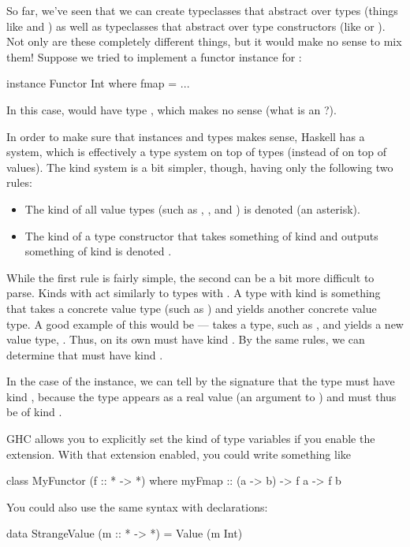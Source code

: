 So far, we've seen that we can create typeclasses that abstract over types (things like
 and ) as well as typeclasses that abstract over type constructors (like
 or ). Not only are these completely different things, but it would make
no sense to mix them! Suppose we tried to implement a functor instance for :
\begin{haskell}
instance Functor Int where
  fmap = ...
\end{haskell}
In this case,  would have type , which makes
no sense (what is an ?).

In order to make sure that instances and types makes sense, Haskell has a  system,
which is effectively a type system on top of types (instead of on top of values). The kind system is
a bit simpler, though, having only the following two rules:
\begin{itemize}
    \item The kind of all value types (such as , , and )
        is denoted \inline{*} (an asterisk).
    \item The kind of a type constructor that takes something of kind  and outputs
        something of kind  is denoted .
\end{itemize}

While the first rule is fairly simple, the second can be a bit more difficult to parse. Kinds with
\inline{->} act similarly to types with \inline{->}. A type with kind \inline{* -> *} is something
that takes a concrete value type (such as ) and yields another concrete value type. A
good example of this would be  ---  takes a type, such as ,
and yields a new value type, . Thus,  on its own must have kind
\inline{* -> *}. By the same rules, we can determine that  must have kind \inline{* -> * -> *}.

In the case of the  instance, we can tell by the signature 
 that the type  must have kind \inline{* -> *},
because the type  appears as a real value (an argument to ) and must thus
be of kind \inline{*}.
\begin{tangent}[frametitle=Explicit Kind Signatures]
GHC allows you to explicitly set the kind of type variables if you enable the
 extension. With that extension enabled, you could write something like
\begin{haskell}
class MyFunctor (f :: * -> *) where
  myFmap :: (a -> b) -> f a -> f b
\end{haskell}
You could also use the same syntax with  declarations:
\begin{haskell}
data StrangeValue (m :: * -> *) = Value (m Int)
\end{haskell}
\end{tangent}

